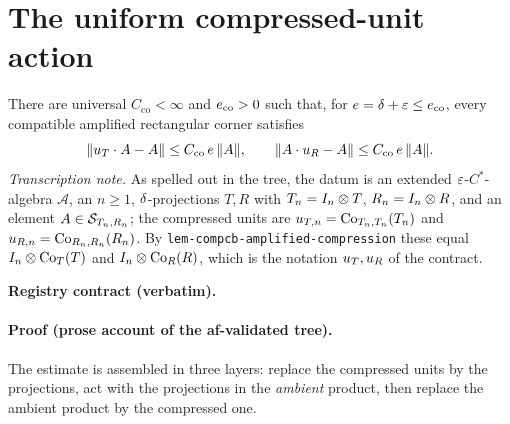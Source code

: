 \section{The uniform compressed-unit action}\label{sec:compcb-compressed-unit-action}

\begin{lemma}\label{lem:compcb-compressed-unit-action}
There are universal $C_{\mathrm{co}}<\infty$ and $e_{\mathrm{co}}>0$ such that, for
$e=\delta+\varepsilon\le e_{\mathrm{co}}$, every compatible amplified rectangular corner
satisfies
\begin{equation}\label{eq:cua-main}
  \lVert u_{T}\mathbin{\cdot} A-A\rVert\le C_{\mathrm{co}}\,e\,\lVert A\rVert,
  \qquad
  \lVert A\mathbin{\cdot} u_{R}-A\rVert\le C_{\mathrm{co}}\,e\,\lVert A\rVert.
\end{equation}
\emph{Transcription note.} As spelled out in the tree, the datum is an extended
$\varepsilon$-$C^*$-algebra $\mathcal A$, an $n\ge1$, $\delta$-projections $T,R$ with
$T_n=I_{n}\otimes T$, $R_n=I_{n}\otimes R$, and an element $A\in\mathcal S_{T_n,R_n}$; the
compressed units are $u_{T,n}=\mathrm{Co}_{T_n,T_n}(T_n)$ and
$u_{R,n}=\mathrm{Co}_{R_n,R_n}(R_n)$. By \texttt{lem-compcb-amplified-compression} these
equal $I_{n}\otimes \mathrm{Co}_{T}(T)$ and $I_{n}\otimes \mathrm{Co}_{R}(R)$, which is the notation
$u_{T},u_{R}$ of the contract.
\end{lemma}

\noindent\textbf{Registry contract (verbatim).}

\paragraph{Proof (prose account of the af-validated tree).}
The estimate is assembled in three layers: replace the compressed units by the
projections, act with the projections in the \emph{ambient} product, then replace the
ambient product by the compressed one.

